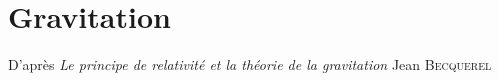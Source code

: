 
\chapter{Gravitation}

{\footnotesize
D'après {\it Le principe de relativité et la théorie de la gravitation} Jean \textsc{Becquerel}
}

